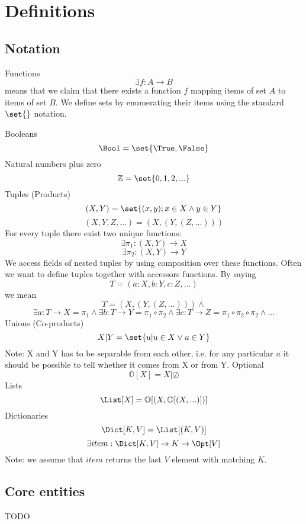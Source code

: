 \section{Definitions}

\subsection{Notation}

Functions
\[ \exists f : A \to B \]
means that we claim that there exists a function \(f\) mapping items of set \(A\)
to items of set \(B\). We define sets by enumerating their items using the
standard \( \set{} \) notation.

Booleans
\[ \Bool = \set{ \True, \False } \]
Natural numbers plus zero
\[ \mathbb{Z} = \set{ 0,1,2,... } \]
Tuples (Products)
\[ (X,Y) = \set{ (x,y) ; x \in X \land y \in Y } \]
\[ (X,Y,Z,...) = (X,(Y,(Z,...))) \]
For every tuple there exist two unique functions:
\[ \exists  \pi_1 : (X,Y) \to X \]
\[ \exists  \pi_2 : (X,Y) \to Y \]
We access fields of nested tuples by using composition over these functions.
Often we want to define tuples together with accessors functions. By
saying
\[ T = (a:X,b:Y,c:Z,...) \]
we mean
\[ T = (X,(Y,(Z,...))) \land \]
\[ \exists a : T \to X = \pi_1 \land \exists b : T \to Y = \pi_1 \circ \pi_2
\land \exists c : T \to Z = \pi_1 \circ \pi_2 \circ \pi_2 \land ... \]
Unions (Co-products)
\[ X|Y = \set{u | u \in X \lor u \in Y }\]
Note: X and Y has to be separable from each other, i.e. for any particular \( u
\) it should be possible to tell whether it comes from X or from Y.
\hfill \break \noindent
Optional
\[ \mathbb{O}[X] = X | \oslash \]
Lists
\[ \List[X] = \mathbb{O}[(X,\mathbb{O}[(X,...)])] \]
Dictionaries
\[ \Dict[K,V] = \List[(K,V)] \]
\[ \exists item : \Dict[K,V] \to K \to \Opt[V] \]
Note: we assume that \(item \) returns the last \( V \) element with matching \(
K \).
\hfill \break \noindent


\subsection{Core entities}

TODO
